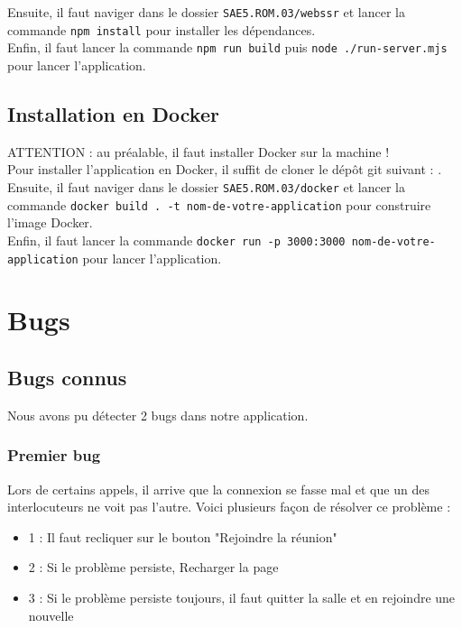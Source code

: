 \documentclass[12pt, a4paper, oneside]{thesis}
\begin{document}
Ensuite, il faut naviger dans le dossier \verb|SAE5.ROM.03/webssr| et lancer la commande \verb|npm install| pour installer les dépendances.\\
Enfin, il faut lancer la commande \verb|npm run build| puis \verb|node ./run-server.mjs| pour lancer l'application.\\

\subsection{Installation en Docker}

ATTENTION : au préalable, il faut installer Docker sur la machine !\\

Pour installer l'application en Docker, il suffit de cloner le dépôt git suivant : \url{}{}.\\

Ensuite, il faut naviger dans le dossier \verb|SAE5.ROM.03/docker| et lancer la commande \verb|docker build . -t nom-de-votre-application| pour construire l'image Docker.\\

Enfin, il faut lancer la commande \verb|docker run -p 3000:3000 nom-de-votre-application| pour lancer l'application.\\

\newpage

\section{Bugs}

\subsection{Bugs connus}

Nous avons pu détecter 2 bugs dans notre application.\\

\subsubsection{Premier bug}

Lors de certains appels, il arrive que la connexion se fasse mal et que un des interlocuteurs ne voit pas l'autre. Voici plusieurs façon de résolver ce problème :\\

\begin{itemize}
  \item 1 : Il faut recliquer sur le bouton "Rejoindre la réunion"
  \item 2 : Si le problème persiste, Recharger la page
  \item 3 : Si le problème persiste toujours, il faut quitter la salle et en rejoindre une nouvelle
\end{itemize}
\end{document}
